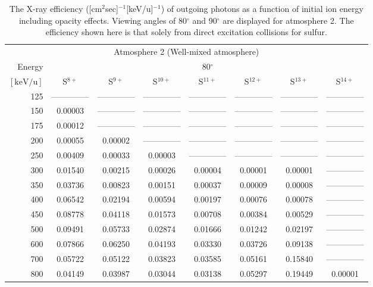 \begin{table}[ht]
    \centering
    \caption{The X-ray efficiency ([cm$^2$sec]$^{-1}$[keV/u]$^{-1}$) of outgoing photons as a function of initial ion energy including opacity effects. Viewing angles of 80$^\circ$ and 90$^\circ$ are displayed for atmosphere 2. The efficiency shown here is that solely from direct excitation collisions for sulfur.}
    \begin{tabular}{r|c|c|c|c|c|c|c}
    \multicolumn{8}{c}{Atmosphere 2 (Well-mixed atmosphere)} \\ \cline{2-8}
    Energy & \multicolumn{7}{c}{80$^\circ$} \\ \cline{2-8}
    $\mathrm{[keV/u]}$ & S$^{8+}$ & S$^{9+}$ & S$^{10+}$ & S$^{11+}$ & S$^{12+}$ & S$^{13+}$ & S$^{14+}$ \\ \cline{1-8}
      125 & -------------- & -------------- & -------------- & -------------- & -------------- & -------------- & -------------- \\
      150 & 0.00003 & -------------- & -------------- & -------------- & -------------- & -------------- & -------------- \\
      175 & 0.00012 & -------------- & -------------- & -------------- & -------------- & -------------- & -------------- \\
      200 & 0.00055 & 0.00002 & -------------- & -------------- & -------------- & -------------- & -------------- \\
      250 & 0.00409 & 0.00033 & 0.00003 & -------------- & -------------- & -------------- & -------------- \\
      300 & 0.01540 & 0.00215 & 0.00026 & 0.00004 & 0.00001 & 0.00001 & -------------- \\
      350 & 0.03736 & 0.00823 & 0.00151 & 0.00037 & 0.00009 & 0.00008 & -------------- \\
      400 & 0.06542 & 0.02194 & 0.00594 & 0.00197 & 0.00076 & 0.00078 & -------------- \\
      450 & 0.08778 & 0.04118 & 0.01573 & 0.00708 & 0.00384 & 0.00529 & -------------- \\
      500 & 0.09491 & 0.05733 & 0.02874 & 0.01666 & 0.01242 & 0.02197 & -------------- \\
      600 & 0.07866 & 0.06250 & 0.04193 & 0.03330 & 0.03726 & 0.09138 & -------------- \\
      700 & 0.05722 & 0.05122 & 0.03823 & 0.03585 & 0.05161 & 0.15840 & -------------- \\
      800 & 0.04149 & 0.03987 & 0.03044 & 0.03138 & 0.05297 & 0.19449 & 0.00001 \\

\end{tabular}
\end{table}
